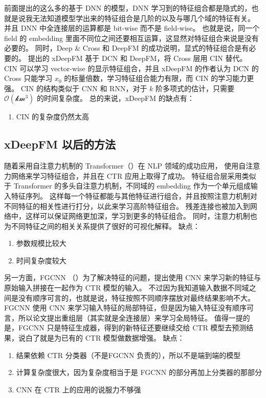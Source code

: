 \documentclass[degree=project,degree-type=project,cjk-font=noto]{thuthesis}
\begin{document}
前面提出的这么多的基于 DNN 的模型，DNN 学习到的特征组合都是隐式的，也就是说我无法知道模型学出来的特征组合是几阶的以及与哪几个域的特征有关。
并且 DNN 中全连接层的运算都是 bit-wise 而不是 field-wise。
也就是说，同一个 field 的 embedding 里面不同位之间还要相互运算，这显然对特征组合来说是没有必要的。
同时，Deep \& Cross 和 DeepFM 的成功说明，显式的特征组合是有必要的。
\cite{xdeepfm} 提出的 xDeepFM 基于 DCN 和 DeepFM，将 Cross 层用 CIN 替代。
CIN 可以学习 vector-wise 的显示特征组合，并且 xDeepFM 的作者认为 DCN 的 Cross 只能学习 $x_0$ 的标量倍数，学习特征组合能力有限，而 CIN 的学习能力更强。
CIN 的结构类似于 CNN 和 RNN，对于 $k$ 阶多项式的估计，只需要 $\mathcal{O(km^3)}$ 的时间复杂度。
总的来说，xDeepFM 的缺点有：

\begin{enumerate}
  \item CIN 的复杂度仍然太高
\end{enumerate}

\subsection{xDeepFM 以后的方法}

随着采用自注意力机制的 Transformer（\cite{self_attention}）在 NLP 领域的成功应用，\cite{autoint} 使用自注意力网络来学习特征组合，并且在 CTR 应用上取得了成功。
特征组合层采用类似于 Transformer 的多头自注意力机制，不同域的 embedding 作为一个单元组成输入特征序列。
这样每一个特征都能与其他特征进行组合，并且按照注意力机制对不同特征的相关性进行打分，以此来学习高阶特征组合。
残差连接也被加入到网络中，这样可以保证网络更加深，学习到更多的特征组合。
同时，注意力机制也为不同特征之间的相关关系提供了很好的可视化解释。
缺点：

\begin{enumerate}
  \item 参数规模比较大
  \item 时间复杂度较大
\end{enumerate}

另一方面，FGCNN （\cite{fgcnn}）为了解决特征的问题，提出使用 CNN 来学习新的特征与原始输入拼接在一起作为 CTR 模型的输入。
不过因为我知道输入数据不同域之间是没有顺序可言的，也就是说，特征按照不同顺序摆放对最终结果影响不大。
FGCNN 使用 CNN 来学习输入特征的局部特征，但是因为输入特征没有顺序可言，所以论文提出重组层（其实就是全连接层）来学习全局特征。
值得一提的是，FGCNN 只是特征生成器，得到的新特征还要继续交给 CTR 模型去预测结果，说白了就是为已有的 CTR 模型做数据增强。
缺点：

\begin{enumerate}
  \item 结果依赖 CTR 分类器（不是FGCNN 负责的），所以不是端到端的模型
  \item 计算复杂度很大，因为复杂度相当于是 FGCNN 的部分再加上分类器的那部分
  \item CNN 在 CTR 上的应用的说服力不够强
\end{enumerate}
\end{document}
